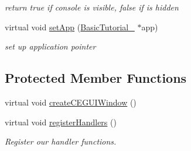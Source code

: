 \begin{DoxyCompactItemize}
\begin{DoxyCompactList}\small\item\em return true if console is visible, false if is hidden \end{DoxyCompactList}\item 
virtual void \hyperlink{class_n_c_t_u_1_1_g_u_i_window_a94b78a60cc24592db3620bb92577ec6b}{set\+App} (\hyperlink{class_basic_tutorial__00}{Basic\+Tutorial\+\_} $\ast$app)\hypertarget{class_n_c_t_u_1_1_g_u_i_window_a94b78a60cc24592db3620bb92577ec6b}{}\label{class_n_c_t_u_1_1_g_u_i_window_a94b78a60cc24592db3620bb92577ec6b}

\begin{DoxyCompactList}\small\item\em set up application pointer \end{DoxyCompactList}\end{DoxyCompactItemize}
\subsection*{Protected Member Functions}
\begin{DoxyCompactItemize}
\item 
virtual void \hyperlink{class_n_c_t_u_1_1_g_u_i_window_a629179c96d0e8f4cad0c967a5878188e}{create\+C\+E\+G\+U\+I\+Window} ()
\item 
virtual void \hyperlink{class_n_c_t_u_1_1_g_u_i_window_a42122d8c814dd42386a63f14dd91fd02}{register\+Handlers} ()\hypertarget{class_n_c_t_u_1_1_g_u_i_window_a42122d8c814dd42386a63f14dd91fd02}{}\label{class_n_c_t_u_1_1_g_u_i_window_a42122d8c814dd42386a63f14dd91fd02}

\begin{DoxyCompactList}\small\item\em Register our handler functions. \end{DoxyCompactList}\end{DoxyCompactItemize}
